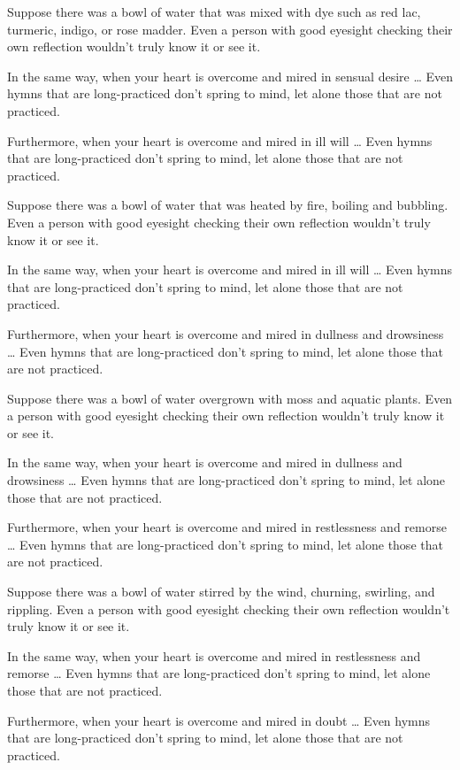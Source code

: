\documentclass[12pt,openany]{book}%
\begin{document}
Suppose there was a bowl of water that was mixed with dye such as red lac, turmeric, indigo, or rose madder. Even a person with good eyesight checking their own reflection wouldn’t truly know it or see it. 

In the same way, when your heart is overcome and mired in sensual desire … Even hymns that are long-practiced don’t spring to mind, let alone those that are not practiced. 

Furthermore, when your heart is overcome and mired in ill will … Even hymns that are long-practiced don’t spring to mind, let alone those that are not practiced. 

Suppose there was a bowl of water that was heated by fire, boiling and bubbling. Even a person with good eyesight checking their own reflection wouldn’t truly know it or see it. 

In the same way, when your heart is overcome and mired in ill will … Even hymns that are long-practiced don’t spring to mind, let alone those that are not practiced. 

Furthermore, when your heart is overcome and mired in dullness and drowsiness … Even hymns that are long-practiced don’t spring to mind, let alone those that are not practiced. 

Suppose there was a bowl of water overgrown with moss and aquatic plants. Even a person with good eyesight checking their own reflection wouldn’t truly know it or see it. 

In the same way, when your heart is overcome and mired in dullness and drowsiness … Even hymns that are long-practiced don’t spring to mind, let alone those that are not practiced. 

Furthermore, when your heart is overcome and mired in restlessness and remorse … Even hymns that are long-practiced don’t spring to mind, let alone those that are not practiced. 

Suppose there was a bowl of water stirred by the wind, churning, swirling, and rippling. Even a person with good eyesight checking their own reflection wouldn’t truly know it or see it. 

In the same way, when your heart is overcome and mired in restlessness and remorse … Even hymns that are long-practiced don’t spring to mind, let alone those that are not practiced. 

Furthermore, when your heart is overcome and mired in doubt … Even hymns that are long-practiced don’t spring to mind, let alone those that are not practiced. 
\end{document}
